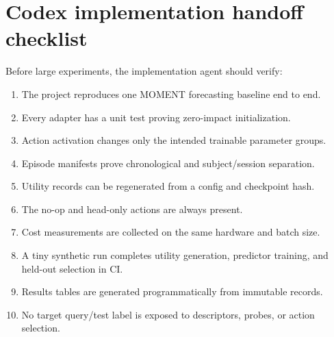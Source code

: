 \documentclass[10pt]{article}
\begin{document}
\section{Codex implementation handoff checklist}

Before large experiments, the implementation agent should verify:
\begin{enumerate}[leftmargin=*, itemsep=1pt]
    \item The project reproduces one MOMENT forecasting baseline end to end.
    \item Every adapter has a unit test proving zero-impact initialization.
    \item Action activation changes only the intended trainable parameter groups.
    \item Episode manifests prove chronological and subject/session separation.
    \item Utility records can be regenerated from a config and checkpoint hash.
    \item The no-op and head-only actions are always present.
    \item Cost measurements are collected on the same hardware and batch size.
    \item A tiny synthetic run completes utility generation, predictor training, and held-out selection in CI.
    \item Results tables are generated programmatically from immutable records.
    \item No target query/test label is exposed to descriptors, probes, or action selection.
\end{enumerate}



\end{document}
